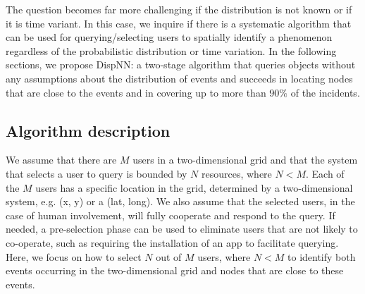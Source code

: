 \documentclass{acm_proc_article-sp}
\begin{document}
The question becomes far more challenging if the distribution is not known or if it is time variant. In this case, we inquire if there is a systematic algorithm that can be used for querying/selecting users to spatially identify a phenomenon regardless of the probabilistic distribution or time variation. In the following sections, we propose DispNN: a two-stage algorithm that queries objects without any assumptions about the distribution of events and succeeds in locating nodes that are close to the events and in covering up to more than $90\%$ of the incidents. \par

\subsection{Algorithm description}
We assume that there are $M$ users in a two-dimensional grid and that the system that selects a user to query is bounded by $N$ resources, where $N < M$.  Each of the $M$ users has a specific location in the grid, determined by a two-dimensional system, e.g. (x, y) or a (lat, long). We also assume that the selected users, in the case of human involvement, will fully cooperate and respond to the query. If needed, a pre-selection phase can be used to eliminate users that are not likely to co-operate, such as requiring the installation of an app to facilitate querying. Here, we focus on how to select $N$ out of $M$ users, where $N < M$ to identify both events occurring in the two-dimensional grid and nodes that are close to these events.\par
\end{document}
